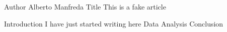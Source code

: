 Author Alberto Manfreda
Title This is a fake article

Introduction I have just started writing here
Data
Analysis
Conclusion
